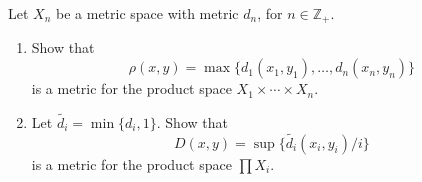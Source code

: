   \begin{exercise}[Munkres 21.3]
    Let $X_n$ be a metric space with metric $d_n$, for $n \in \mathbb{Z}_+$.
    \begin{enumerate}
      \item Show that
        \begin{equation}
          \rho(x,y) = \max\{d_1(x_1, y_1), \ldots, d_n(x_n, y_n)\}
        \end{equation}
        is a metric for the product space $X_1 \times \cdots \times X_n$.
      
      \item Let $\tilde{d_i} = \min\{d_i, 1\}$. Show that
        \begin{equation}
          D(x,y) = \sup\{\tilde{d_i}(x_i, y_i)/i\}
        \end{equation}
        is a metric for the product space $\prod X_i$.
    \end{enumerate}
  \end{exercise}
